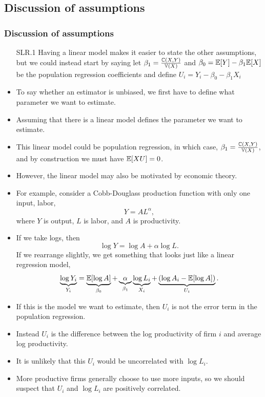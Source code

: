 \subsection{Discussion of assumptions}
\begin{frame}[allowframebreaks]
  \frametitle{Discussion of assumptions}
  \begin{itemize}
  \item[SLR.1] Having a linear model makes it easier to state the other
    assumptions, but we could instead start by saying let $\beta_1 =
    \frac{\mathbb{C}(X,Y)}{\mathbb{V}(X)}$ and $\beta_0 = \mathbb{E}[Y] - \beta_1 \mathbb{E}[X]$
    be the population regression coefficients and define $U_i =
    Y_i - \beta_0 - \beta_1 X_i$
  \framebreak
\item To say whether an estimator is unbiased, we first have to define what
parameter we want to estimate. 
\item Assuming that there is a linear model
defines the parameter we want to estimate. 
\item This linear model could be
population regression, in which case, $\beta_1 = \frac{\mathbb{C}(X,Y)
}{\mathbb{V}(X)}$, and by construction we must have
$\mathbb{E}[XU]=0$. 
\item However, the linear model may also be motivated by economic
theory. 
\item For example, consider a Cobb-Douglass production function with
only one input, labor,
\[ Y = A L^\alpha, \] 
where $Y$ is output, $L$ is labor, and $A$ is productivity. 
\item If we take logs, then
\[ \log Y = \log A + \alpha \log L. \]
If we rearrange slightly, we get something that looks just like a
linear regression model, 
\[ \underbrace{\log Y_i}_{Y_i} = \underbrace{\mathbb{E}[\log A]}_{\beta_0}
+ \underbrace{\alpha}_{\beta_1} \underbrace{\log L_i}_{X_i} +
\underbrace{(\log{A}_i - \mathbb{E}[\log A])}_{U_i}. \]
\item If this is the model we want to estimate, then $U_i$ is not the
error term in the population regression. 
\item Instead $U_i$ is the
difference between the log productivity of firm $i$ and average log
productivity. 
\item It is unlikely that this $U_i$ would be
uncorrelated with $\log L_i$. 
\item More productive firms generally choose
to use more inputs, so we should suspect that $U_i$ and $\log
L_i$ are positively correlated.
 \end{itemize}
\end{frame}


